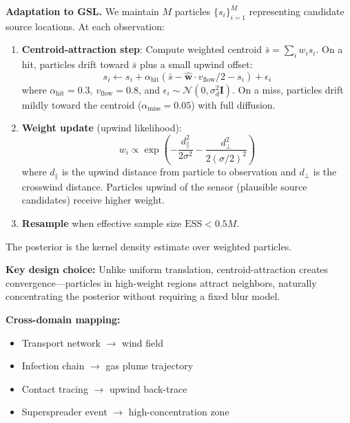 \documentclass[conference]{IEEEtran}
\begin{document}
\textbf{Adaptation to GSL.} We maintain $M$ particles $\{s_i\}_{i=1}^M$ representing candidate source locations.
At each observation:
\begin{enumerate}
    \item \textbf{Centroid-attraction step}: Compute weighted centroid $\bar{s} = \sum_i w_i s_i$. On a hit, particles drift toward $\bar{s}$ plus a small upwind offset:
    \begin{equation}
        s_i \leftarrow s_i + \alpha_{\text{hit}} \left(\bar{s} - \hat{\mathbf{w}} \cdot v_{\text{flow}}/2 - s_i\right) + \epsilon_i
    \end{equation}
    where $\alpha_{\text{hit}} = 0.3$, $v_{\text{flow}} = 0.8$, and $\epsilon_i \sim \mathcal{N}(0, \sigma_d^2 \mathbf{I})$.
    On a miss, particles drift mildly toward the centroid ($\alpha_{\text{miss}} = 0.05$) with full diffusion.

    \item \textbf{Weight update} (upwind likelihood):
    \begin{equation}
        w_i \propto \exp\!\left(-\frac{d_{\parallel}^2}{2\sigma^2} - \frac{d_{\perp}^2}{2(\sigma/2)^2}\right)
    \end{equation}
    where $d_{\parallel}$ is the upwind distance from particle to observation and $d_{\perp}$ is the crosswind distance.
    Particles upwind of the sensor (plausible source candidates) receive higher weight.

    \item \textbf{Resample} when effective sample size $\text{ESS} < 0.5 M$.
\end{enumerate}
The posterior is the kernel density estimate over weighted particles.

\textbf{Key design choice:} Unlike uniform translation, centroid-attraction creates convergence---particles in high-weight regions attract neighbors, naturally concentrating the posterior without requiring a fixed blur model.

\textbf{Cross-domain mapping:}
\begin{itemize}
    \item Transport network $\to$ wind field
    \item Infection chain $\to$ gas plume trajectory
    \item Contact tracing $\to$ upwind back-trace
    \item Superspreader event $\to$ high-concentration zone
\end{itemize}
\end{document}
